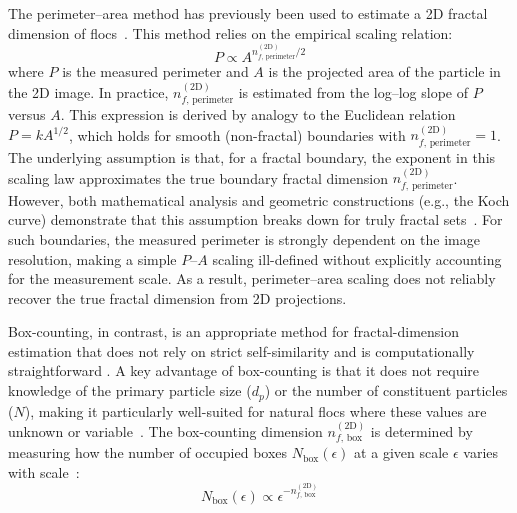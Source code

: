 \documentclass{agujournal2019}
\begin{document}
The perimeter--area method has previously been used to estimate a 2D fractal dimension of flocs~\cite{lee2004prediction, maggi2004method, tang2015reconstructing}. This method relies on the empirical scaling relation:
\begin{equation}
P \propto A^{n_{f,\,\mathrm{perimeter}}^{(\mathrm{2D})} / 2}
\end{equation}
where $P$ is the measured perimeter and $A$ is the projected area of the particle in the 2D image. In practice, $n_{f,\,\mathrm{perimeter}}^{(\mathrm{2D})}$ is estimated from the log--log slope of $P$ versus $A$. This expression is derived by analogy to the Euclidean relation $P = k A^{1/2}$, which holds for smooth (non-fractal) boundaries with $n_{f,\,\mathrm{perimeter}}^{(\mathrm{2D})} = 1$. The underlying assumption is that, for a fractal boundary, the exponent in this scaling law approximates the true boundary fractal dimension $n_{f,\,\mathrm{perimeter}}^{(\mathrm{2D})}$. However, both mathematical analysis and geometric constructions (e.g., the Koch curve) demonstrate that this assumption breaks down for truly fractal sets~\cite{cheng1995perimeter,frame_mandelbrot_neger_2025}. For such boundaries, the measured perimeter is strongly dependent on the image resolution, making a simple $P$--$A$ scaling ill-defined without explicitly accounting for the measurement scale. As a result, perimeter--area scaling does not reliably recover the true fractal dimension from 2D projections.

Box-counting, in contrast, is an appropriate method for fractal-dimension estimation that does not rely on strict self-similarity and is computationally straightforward \cite{foroutan1999advances}. A key advantage of box-counting is that it does not require knowledge of the primary particle size ($d_p$) or the number of constituent particles ($N$), making it particularly well-suited for natural flocs where these values are unknown or variable~\cite{bellouti1997flocs, spencer2022quantification}. The box-counting dimension $n_{f,\,\mathrm{box}}^{(\mathrm{2D})}$ is determined by measuring how the number of occupied boxes $N_{\text{box}}(\epsilon)$ at a given scale $\epsilon$ varies with scale~\cite{mandelbrot1967long}:
\begin{equation}
N_{\text{box}}(\epsilon) \propto \epsilon^{-n_{f,\,\mathrm{box}}^{(\mathrm{2D})}}
\end{equation}
\end{document}
